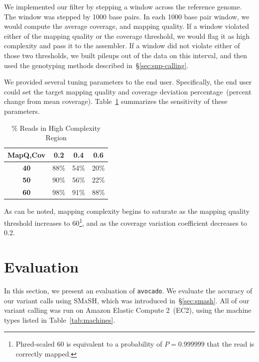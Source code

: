 \documentclass{acm_proc_article-sp}
\begin{document}
We implemented our filter by stepping a window across the reference genome. The window was stepped by 1000 base pairs. In each
1000 base pair window, we would compute the average coverage, and mapping quality. If a window violated either of the mapping
quality or the coverage threshold, we would flag it as high complexity and pass it to the assembler. If a window did not violate either
of those two thresholds, we built pileups out of the data on this interval, and then used the genotyping methods described
in~\S\ref{sec:snp-calling}.

We provided several tuning parameters to the end user. Specifically, the end user could set the target mapping quality and coverage
deviation percentage~(percent change from mean coverage). Table~\ref{tab:filter} summarizes the sensitivity of these parameters.

\begin{table}[h]
\caption{\% Reads in High Complexity Region}
\begin{center}
\begin{tabular}{| c || c | c | c |}
\hline
\bf MapQ,Cov & \bf 0.2 & \bf 0.4 & \bf 0.6 \\
\hline
\hline
\bf 40 & 88\% & 54\% & 20\% \\
\bf 50 & 90\% & 56\% & 22\% \\
\bf 60 & 98\% & 91\% & 88\% \\
\hline 
\end{tabular}
\end{center}
\label{tab:filter}
\end{table}

As can be noted, mapping complexity begins to saturate as the mapping quality threshold increases to 60\footnote{Phred-scaled 60 is
equivalent to a probability of $P=0.999999$ that the read is correctly mapped.}, and as the coverage variation coefficient decreases to 0.2.

\section{Evaluation}
\label{sec:evaluation}


In this section, we present an evaluation of \texttt{avocado}. We evaluate the accuracy of our variant calls using \textsc{SMaSH}, which
was introduced in~\S\ref{sec:smash}. All of our variant calling was run on Amazon Elastic Compute 2~(EC2), using the machine types
listed in Table~\ref{tab:machines}.
\end{document}
